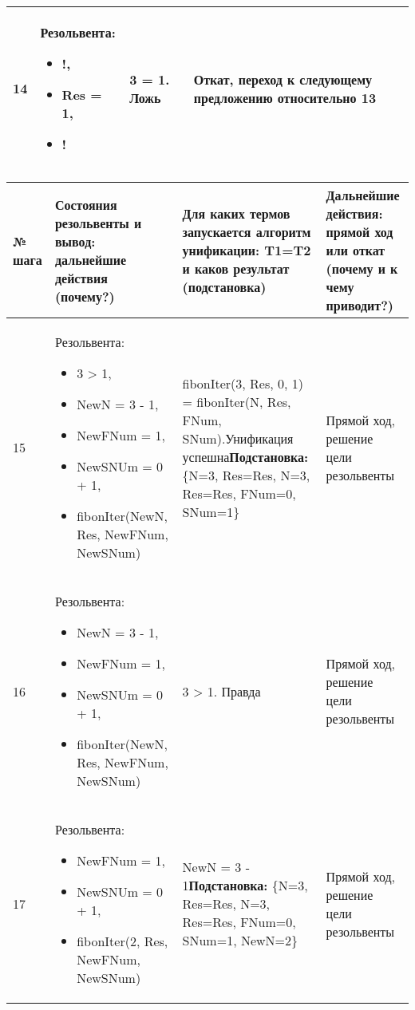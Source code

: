 \documentclass[14pt,a4paper]{scrreprt}
\begin{document}
\begin{table}[H]
\begin{tabular}{|p{0.8cm\small}|p{4.7cm\small}|p{5.7cm\small}|p{4cm\small}|}
		\hline
		14 & Резольвента:\begin{itemize} \item !, \item Res = 1, \item ! \end{itemize} & 3 = 1. Ложь & Откат, переход к следующему предложению относительно 13\\
		\hline
	\end{tabular}
\end{table}

\begin{table}[H]
	\begin{tabular}{|p{0.8cm\small}|p{4.7cm\small}|p{5.7cm\small}|p{4cm\small}|}	
		\hline
		№ шага & Состояния резольвенты и вывод: дальнейшие действия (почему?) & Для каких термов запускается алгоритм унификации: T1=T2 и каков результат (подстановка) & Дальнейшие действия: прямой ход или откат (почему и к чему приводит?)\\
		\hline
		15 & Резольвента:\begin{itemize} \item 3 > 1, \item NewN = 3 - 1, \item NewFNum = 1, \item NewSNUm = 0 + 1, \item fibonIter(NewN, Res, NewFNum, NewSNum) \end{itemize} & fibonIter(3, Res, 0, 1) = fibonIter(N, Res, FNum, SNum).Унификация успешна\linebreak \textbf{Подстановка:} \{N=3, Res=Res, N=3, Res=Res, FNum=0, SNum=1\} & Прямой ход, решение цели резольвенты\\
		\hline
		16 & Резольвента:\begin{itemize} \item NewN = 3 - 1, \item NewFNum = 1, \item NewSNUm = 0 + 1, \item fibonIter(NewN, Res, NewFNum, NewSNum) \end{itemize} & 3 > 1. Правда & Прямой ход, решение цели резольвенты\\
		\hline
		17 & Резольвента:\begin{itemize} \item NewFNum = 1, \item NewSNUm = 0 + 1, \item fibonIter(2, Res, NewFNum, NewSNum) \end{itemize} & NewN = 3 - 1\linebreak \textbf{Подстановка:} \{N=3, Res=Res, N=3, Res=Res, FNum=0, SNum=1, NewN=2\} & Прямой ход, решение цели резольвенты\\

\end{tabular}
\end{table}
\end{document}
